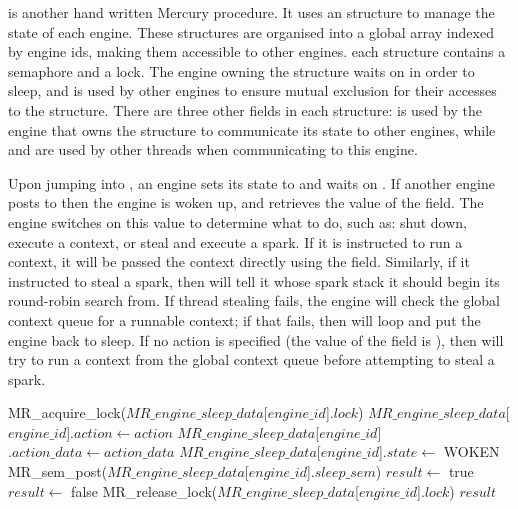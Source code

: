 \sleep is another hand written Mercury procedure.
It uses an
\enginesleepsync structure to manage the state of each engine.
These structures are organised into a global array indexed by engine ids,
making them accessible to other engines.
each structure contains a semaphore and a lock.
The engine owning the structure waits on  in order to
sleep,
and  is used by other engines to ensure mutual exclusion for
their accesses to the \enginesleepsync structure.
There are three other fields in each structure:
 is used by the engine that owns the structure to communicate
its state to other engines,
while  and  are used by other threads when
communicating to this engine.

Upon jumping into \idle,
an engine sets its state to  and waits on .
If another engine posts to  then the engine is woken up,
and retrieves the value of the  field.
The engine switches on this value to determine what to do,
such as:
shut down, 
execute a context, or
steal and execute a spark.
If it is instructed to run a context,
it will be passed the context directly
using the  field.
Similarly, if it instructed to steal a spark,
then  will tell
it whose spark stack it should begin its round-robin search from.
If thread stealing fails,
the engine will check the global context queue for
a runnable context;
if that fails,
then \idle will loop and put the engine back to sleep.
If no action is specified
(the value of the  field is ),
then \sleep will try to run a context from the global context queue before
attempting to steal a spark.

\begin{algorithm}[tbp]
\begin{algorithmic}
    \State MR\_acquire\_lock($MR\_engine\_sleep\_data$[$engine\_id$]$.lock$)
        \State $MR\_engine\_sleep\_data$[$engine\_id$]$.action \gets action$
        \State $MR\_engine\_sleep\_data$[$engine\_id$]$.action\_data \gets action\_data$
        \State $MR\_engine\_sleep\_data$[$engine\_id$]$.state \gets$ WOKEN
        \State MR\_sem\_post($MR\_engine\_sleep\_data$[$engine\_id$]$.sleep\_sem$)
        \State $result \gets$ true
    \Else
        \State $result \gets$ false
    \EndIf
    \State MR\_release\_lock($MR\_engine\_sleep\_data$[$engine\_id$]$.lock$)
    \State \Return $result$
\EndProcedure
\end{algorithmic}
\caption{\wakeengine}
\label{alg:wake_engine}
\end{algorithm}

